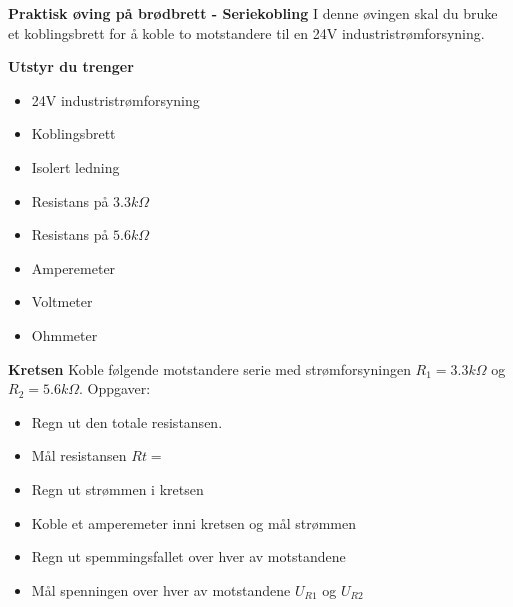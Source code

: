 

\large \textbf{Praktisk øving på brødbrett - Seriekobling }
\normalsize 
\vskip 10pt 
I denne øvingen skal du bruke et koblingsbrett for å koble to motstandere til en 24V industristrømforsyning.

\vskip 10pt 
\large \textbf{Utstyr du trenger}

\vskip 10pt 
\begin{itemize}[noitemsep]

\item 24V industristrømforsyning
\item Koblingsbrett
\item Isolert ledning
\item Resistans på $3.3k\Omega$
\item Resistans på $5.6k\Omega$
\item Amperemeter
\item Voltmeter
\item Ohmmeter
\end{itemize}


\large \textbf{Kretsen}
\normalsize
\vskip 10pt 
Koble følgende motstandere serie med strømforsyningen $R_{1}=3.3k\Omega$ og $R_{2}=5.6k\Omega$.
Oppgaver:
\begin{itemize}[noitemsep]
	\item Regn ut den totale resistansen.
	\item Mål resistansen $R{t}=$
	\item Regn ut strømmen i kretsen 
	\item Koble et amperemeter inni kretsen og mål strømmen
	\item Regn ut spemmingsfallet over hver av motstandene
	\item Mål spenningen over hver av motstandene $U_{R1}$ og $U_{R2}$
\end{itemize}




















